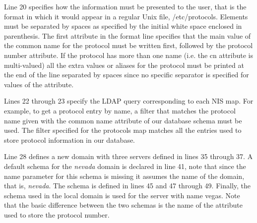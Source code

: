 Line 20 specifies how the information must be presented to the user,
that is the format in which it would appear in a regular Unix file,
/etc/protocols. Elements must be separated by spaces as specified by
the initial white space enclosed in parenthesis. The first attribute in the
format line specifies that the main value of the common name for the
protocol must be written first, followed by the protocol number
attribute. If the protocol has more than one name (i.e.
the cn attribute is multi-valued) all the extra values or aliases for the
protocol must be printed at the end of the line separated by spaces
since no specific separator is specified for values of the attribute.

Lines 22 through 23 specify the LDAP query corresponding to each
NIS map. For example, to get a protocol entry by name, a filter that
matches the protocol name given with the common name attribute of our
database schema must be used. The filter specified for the protocols 
map matches all the entries used to store protocol information in our
database.

Line 28 defines a new domain with three servers defined in lines 35
through 37. A default schema for the {\em nevada} domain is declared
in line 41, note that since the name parameter for this schema is
missing it assumes the name of the domain, that is, {\em nevada}.
The schema is defined in lines 45 and 47 through 49. Finally, the
schema used in the local domain is used for the server with name
vegas. Note that the basic difference between the two schemas is the
name of the attribute used to store the protocol number.
















